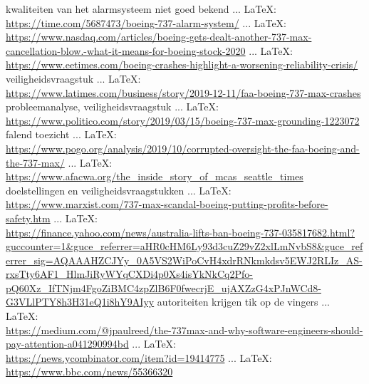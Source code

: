 \begin{thebibliography}{99}
{{{			kwaliteiten van het alarmsysteem niet goed bekend
			 ... \LaTeX:\\ \url{https://time.com/5687473/boeing-737-alarm-system/}
			 ... \LaTeX:\\ \url{https://www.nasdaq.com/articles/boeing-gets-dealt-another-737-max-cancellation-blow.-what-it-means-for-boeing-stock-2020}
			 ... \LaTeX:\\ \url{https://www.eetimes.com/boeing-crashes-highlight-a-worsening-reliability-crisis/}
			veiligheidsvraagstuk
			 ... \LaTeX:\\ \url{https://www.latimes.com/business/story/2019-12-11/faa-boeing-737-max-crashes}
			probleemanalyse, veiligheidsvraagstuk
			 ... \LaTeX:\\ \url{https://www.politico.com/story/2019/03/15/boeing-737-max-grounding-1223072}
			falend toezicht
			 ... \LaTeX:\\ \url{https://www.pogo.org/analysis/2019/10/corrupted-oversight-the-faa-boeing-and-the-737-max/}
			 ... \LaTeX:\\ \url{https://www.afacwa.org/the_inside_story_of_mcas_seattle_times}
			doelstellingen en veiligheidsvraagstukken
			 ... \LaTeX:\\ \url{https://www.marxist.com/737-max-scandal-boeing-putting-profits-before-safety.htm}
			 ... \LaTeX:\\ \url{https://finance.yahoo.com/news/australia-lifts-ban-boeing-737-035817682.html?guccounter=1&guce_referrer=aHR0cHM6Ly93d3cuZ29vZ2xlLmNvbS8&guce_referrer_sig=AQAAAHZCJYy_0A5VS2WiPoCvH4xdrRNkmkdsv5EWJ2RLIz_AS-rxsTty6AF1_HlmJiRyWYqCXDi4p0Xs4isYkNkCq2Pfo-pQ60Xz_IfTNjm4FgoZiBMC4zpZlB6F0fwecrjE_ujAXZzG4xPJnWCd8-G3VLlPTY8h3H31eQ1i8hY9AIyy}
			autoriteiten krijgen tik op de vingers
			 ... \LaTeX:\\ \url{https://medium.com/@jpaulreed/the-737max-and-why-software-engineers-should-pay-attention-a041290994bd}
			 ... \LaTeX:\\ \url{https://news.ycombinator.com/item?id=19414775}
			 ... \LaTeX:\\ \url{https://www.bbc.com/news/55366320}
}}}
\end{thebibliography}
